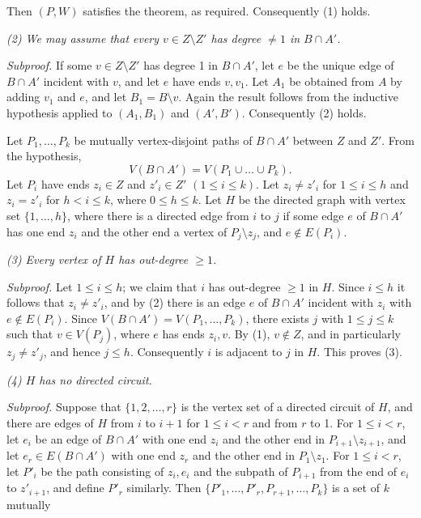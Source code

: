 \noindent Then $(P, W)$ satisfies the theorem, as required. Consequently (1) holds.

\textit{(2) We may assume that every $v \in Z \setminus Z'$ has degree $\ne 1$ in $B \cap A'$.}

\textit{Subproof.} If some $v \in Z \setminus Z'$ has degree 1 in $B \cap A'$, let $e$ be the unique edge of $B \cap A'$ incident with $v$, and let $e$ have ends $v, v_1$. Let $A_1$ be obtained from $A$ by adding $v_1$ and $e$, and let $B_1 = B \setminus v$. Again the result follows from the inductive hypothesis applied to $(A_1, B_1)$ and $(A', B')$. Consequently (2) holds.

Let $P_1, \dots, P_k$ be mutually vertex-disjoint paths of $B \cap A'$ between $Z$ and $Z'$. From the hypothesis,
\begin{equation*}
V(B \cap A') = V(P_1 \cup \dots \cup P_k).
\end{equation*}
Let $P_i$ have ends $z_i \in Z$ and $z'_i \in Z'$ $(1 \le i \le k)$. Let $z_i \ne z'_i$ for $1 \le i \le h$ and $z_i = z'_i$ for $h < i \le k$, where $0 \le h \le k$. Let $H$ be the directed graph with vertex set $\{1, \dots, h\}$, where there is a directed edge from $i$ to $j$ if some edge $e$ of $B \cap A'$ has one end $z_i$ and the other end a vertex of $P_j \setminus z_j$, and $e \notin E(P_i)$.

\textit{(3) Every vertex of $H$ has out-degree $\ge 1$.}

\textit{Subproof.} Let $1 \le i \le h$; we claim that $i$ has out-degree $\ge 1$ in $H$. Since $i \le h$ it follows that $z_i \ne z'_i$, and by (2) there is an edge $e$ of $B \cap A'$ incident with $z_i$ with $e \notin E(P_i)$. Since $V(B \cap A') = V(P_1, \dots, P_k)$, there exists $j$ with $1 \le j \le k$ such that $v \in V(P_j)$, where $e$ has ends $z_i, v$. By (1), $v \notin Z$, and in particularly $z_j \ne z'_j$, and hence $j \le h$. Consequently $i$ is adjacent to $j$ in $H$. This proves (3).

\textit{(4) $H$ has no directed circuit.}

\textit{Subproof.} Suppose that $\{1, 2, \dots, r\}$ is the vertex set of a directed circuit of $H$, and there are edges of $H$ from $i$ to $i + 1$ for $1 \le i < r$ and from $r$ to 1. For $1 \le i < r$, let $e_i$ be an edge of $B \cap A'$ with one end $z_i$ and the other end in $P_{i+1} \setminus z_{i+1}$, and let $e_r \in E(B \cap A')$ with one end $z_r$ and the other end in $P_1 \setminus z_1$. For $1 \le i < r$, let $P'_i$ be the path consisting of $z_i, e_i$ and the subpath of $P_{i+1}$ from the end of $e_i$ to $z'_{i+1}$, and define $P'_r$ similarly. Then $\{P'_1, \dots, P'_r, P_{r+1}, \dots, P_k\}$ is a set of $k$ mutually
